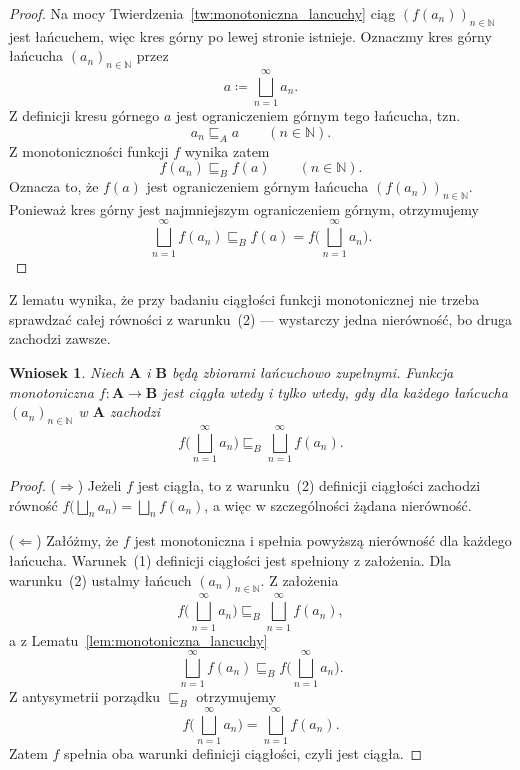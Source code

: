 \documentclass[11pt,a4paper]{article}
\theoremstyle{definition}
\theoremstyle{plain}
\newtheorem{wniosek}[definicja]{Wniosek}
\begin{document}
\begin{proof}
	Na mocy Twierdzenia~\ref{tw:monotoniczna_lancuchy} ciąg
	$(f(a_n))_{n\in\mathbb N}$ jest łańcuchem, więc kres górny po lewej
	stronie istnieje. Oznaczmy kres górny łańcucha $(a_n)_{n\in\mathbb N}$
	przez
	\[
	a\coloneqq \bigsqcup_{n=1}^{\infty}a_n.
	\]
	Z definicji kresu górnego $a$ jest ograniczeniem górnym tego łańcucha,
	tzn.
	\[
	a_n\sqsubseteq_A a
	\qquad(n\in\mathbb N).
	\]
	Z monotoniczności funkcji $f$ wynika zatem
	\[
	f(a_n)\sqsubseteq_B f(a)
	\qquad(n\in\mathbb N).
	\]
	Oznacza to, że $f(a)$ jest ograniczeniem górnym łańcucha
	$(f(a_n))_{n\in\mathbb N}$. Ponieważ kres górny jest najmniejszym
	ograniczeniem górnym, otrzymujemy
	\[
	\bigsqcup_{n=1}^{\infty}f(a_n)
	\sqsubseteq_B
	f(a)
	=
	f\Big(\bigsqcup_{n=1}^{\infty}a_n\Big).
	\]
\end{proof}

Z lematu wynika, że przy badaniu ciągłości funkcji monotonicznej nie
trzeba sprawdzać całej równości z warunku~(2) --- wystarczy jedna
nierówność, bo druga zachodzi zawsze.

\begin{wniosek}\label{wn:ciaglosc_monotonicznej}
	Niech $\boldsymbol{A}$ i $\boldsymbol{B}$ będą zbiorami łańcuchowo
	zupełnymi. Funkcja monotoniczna $f:\boldsymbol{A}\to\boldsymbol{B}$
	jest ciągła wtedy i tylko wtedy, gdy dla każdego łańcucha
	$(a_n)_{n\in\mathbb N}$ w $\boldsymbol{A}$ zachodzi
	\[
	f\Big(\bigsqcup_{n=1}^{\infty}a_n\Big)\sqsubseteq_B\bigsqcup_{n=1}^{\infty}f(a_n).
	\]
\end{wniosek}

\begin{proof}
	($\Rightarrow$) Jeżeli $f$ jest ciągła, to z warunku~(2) definicji
	ciągłości zachodzi równość
	$f\big(\bigsqcup_{n}a_n\big)=\bigsqcup_{n}f(a_n)$, a więc
	w szczególności żądana nierówność.
	
	($\Leftarrow$) Załóżmy, że $f$ jest monotoniczna i spełnia powyższą
	nierówność dla każdego łańcucha. Warunek~(1) definicji ciągłości jest
	spełniony z założenia. Dla warunku~(2) ustalmy łańcuch
	$(a_n)_{n\in\mathbb N}$. Z założenia
	\[
	f\Big(\bigsqcup_{n=1}^{\infty}a_n\Big)\sqsubseteq_B\bigsqcup_{n=1}^{\infty}f(a_n),
	\]
	a z Lematu~\ref{lem:monotoniczna_lancuchy}
	\[
	\bigsqcup_{n=1}^{\infty}f(a_n)\sqsubseteq_B f\Big(\bigsqcup_{n=1}^{\infty}a_n\Big).
	\]
	Z antysymetrii porządku $\sqsubseteq_B$ otrzymujemy
	\[
	f\Big(\bigsqcup_{n=1}^{\infty}a_n\Big)=\bigsqcup_{n=1}^{\infty}f(a_n).
	\]
	Zatem $f$ spełnia oba warunki definicji ciągłości, czyli jest ciągła.
\end{proof}
\end{document}
